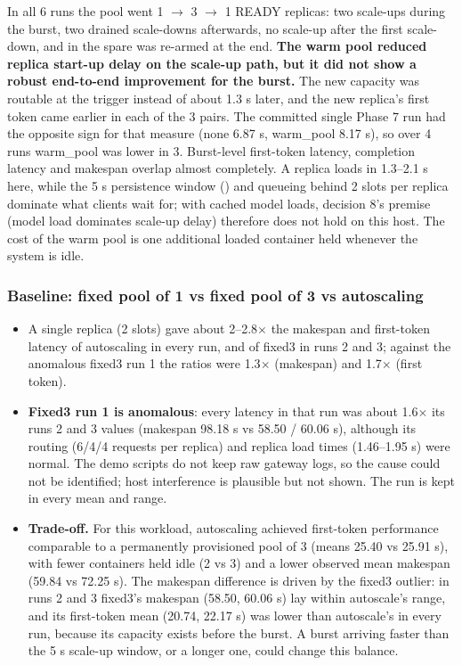 \documentclass[11pt,a4paper]{article}
\DeclareRobustCommand{\code}[1]{\texttt{\detokenize{#1}}}
\begin{document}
In all 6 runs the pool went 1 $\rightarrow$ 3 $\rightarrow$ 1 READY replicas: two scale-ups during
the burst, two drained scale-downs afterwards, no scale-up after the first scale-down, and in
\code{warm_pool} the spare was re-armed at the end. \textbf{The warm pool reduced replica start-up
delay on the scale-up path, but it did not show a robust end-to-end improvement for the burst.} The
new capacity was routable at the trigger instead of about 1.3 s later, and the new replica's first
token came earlier in each of the 3 pairs. The committed single Phase 7 run had the opposite sign for
that measure (none 6.87 s, warm\_pool 8.17 s), so over 4 runs warm\_pool was lower in 3. Burst-level
first-token latency, completion latency and makespan overlap almost completely. A replica loads in
1.3--2.1 s here, while the 5 s persistence window (\code{scale_up_after_s}) and queueing behind 2
slots per replica dominate what clients wait for; with cached model loads, decision 8's premise
(model load dominates scale-up delay) therefore does not hold on this host. The cost of the warm pool
is one additional loaded container held whenever the system is idle.

\subsubsection{Baseline: fixed pool of 1 vs fixed pool of 3 vs autoscaling}
\label{sec:pools}

\begin{itemize}
  \item A single replica (2 slots) gave about 2--2.8$\times$ the makespan and first-token latency of
        autoscaling in every run, and of fixed3 in runs 2 and 3; against the anomalous fixed3 run 1
        the ratios were 1.3$\times$ (makespan) and 1.7$\times$ (first token).
  \item \textbf{Fixed3 run 1 is anomalous}: every latency in that run was about 1.6$\times$ its runs
        2 and 3 values (makespan 98.18 s vs 58.50 / 60.06 s), although its routing (6/4/4 requests
        per replica) and replica load times (1.46--1.95 s) were normal. The demo scripts do not keep
        raw gateway logs, so the cause could not be identified; host interference is plausible but
        not shown. The run is kept in every mean and range.
  \item \textbf{Trade-off.} For this workload, autoscaling achieved first-token performance comparable
        to a permanently provisioned pool of 3 (means 25.40 vs 25.91 s), with fewer containers held
        idle (2 vs 3) and a lower observed mean makespan (59.84 vs 72.25 s). The makespan difference
        is driven by the fixed3 outlier: in runs 2 and 3 fixed3's makespan (58.50, 60.06 s) lay
        within autoscale's range, and its first-token mean (20.74, 22.17 s) was lower than
        autoscale's in every run, because its capacity exists before the burst. A burst arriving
        faster than the 5 s scale-up window, or a longer one, could change this balance.
\end{itemize}
\end{document}
